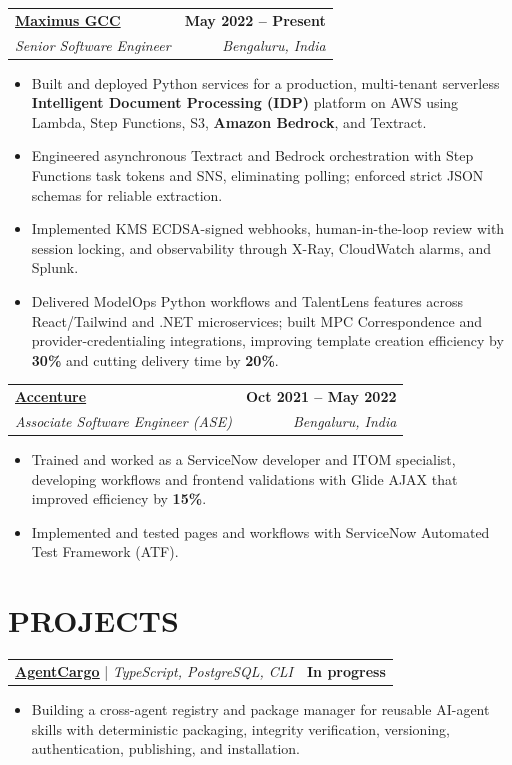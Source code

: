 \documentclass[letterpaper,10pt]{article}
\makeatletter
\newcommand{\externalIcon}{\raisebox{0.15ex}{\,\scriptsize\faExternalLinkAlt}}
\newcommand{\experience}[5]{%
  \begin{tabular*}{\textwidth}{@{}l@{\extracolsep{\fill}}r@{}}
    \href{#1}{\textbf{#2}\externalIcon} & \textbf{#3} \\
    \textit{#4} & \textit{#5}
  \end{tabular*}
}
\newcommand{\project}[4]{%
  \begin{tabular*}{\textwidth}{@{}l@{\extracolsep{\fill}}r@{}}
    \href{#1}{\underline{\textbf{#2}}\externalIcon} \enspace | \enspace \emph{#3} & \textbf{#4}
  \end{tabular*}
}
\makeatother
\begin{document}
\experience{https://maximus.com}{Maximus GCC}{May 2022 -- Present}{Senior Software Engineer}{Bengaluru, India}
\begin{itemize}
  \item Built and deployed Python services for a production, multi-tenant serverless \textbf{Intelligent Document Processing (IDP)} platform on AWS using Lambda, Step Functions, S3, \textbf{Amazon Bedrock}, and Textract.
  \item Engineered asynchronous Textract and Bedrock orchestration with Step Functions task tokens and SNS, eliminating polling; enforced strict JSON schemas for reliable extraction.
  \item Implemented KMS ECDSA-signed webhooks, human-in-the-loop review with session locking, and observability through X-Ray, CloudWatch alarms, and Splunk.
  \item Delivered ModelOps Python workflows and TalentLens features across React/Tailwind and .NET microservices; built MPC Correspondence and provider-credentialing integrations, improving template creation efficiency by \textbf{30\%} and cutting delivery time by \textbf{20\%}.
\end{itemize}

\experience{https://www.accenture.com/in-en}{Accenture}{Oct 2021 -- May 2022}{Associate Software Engineer (ASE)}{Bengaluru, India}
\begin{itemize}
  \item Trained and worked as a ServiceNow developer and ITOM specialist, developing workflows and frontend validations with Glide AJAX that improved efficiency by \textbf{15\%}.
  \item Implemented and tested pages and workflows with ServiceNow Automated Test Framework (ATF).
\end{itemize}

\section{PROJECTS}

\project{https://github.com/PatilSarvesh/AgentCargo}{AgentCargo}{TypeScript, PostgreSQL, CLI}{In progress}
\begin{itemize}
  \item Building a cross-agent registry and package manager for reusable AI-agent skills with deterministic packaging, integrity verification, versioning, authentication, publishing, and installation.
\end{itemize}
\end{document}
